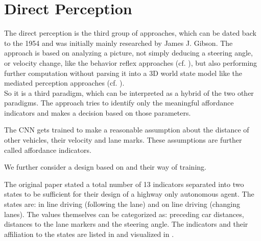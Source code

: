 


\section{Direct Perception}\label{sec: Direct Perception}


The direct perception is the third group of approaches, which can be dated back to the 1954 and was initially mainly researched by James J. Gibson. \cite{gibson1954theory} The approach is based on analyzing a picture, not simply deducing a steering angle, or velocity change, like the behavior reflex approaches (cf. ), but also performing further computation without parsing it into a 3D world state model like the mediated perception approaches (cf. ). \cite{chen2015deepdriving}\\
So it is a third paradigm, which can be interpreted as a hybrid of the two other paradigms. The approach tries to identify only the meaningful affordance indicators and makes a decision based on those parameters. 

The CNN gets trained to make a reasonable assumption about the distance of other vehicles, their velocity and lane marks. These assumptions are further called affordance indicators.

We further consider a design based on \cite{chen2015deepdriving} and their way of training.

The original paper \cite{chen2015deepdriving} stated a total number of 13 indicators separated into two states to be sufficient for their design of a highway only autonomous agent. The states are: in line driving (following the lane) and on line driving (changing lanes). The values themselves can be categorized as: preceding car distances, distances to the lane markers and the steering angle. The indicators and their affiliation to the states are listed in  and visualized in .

